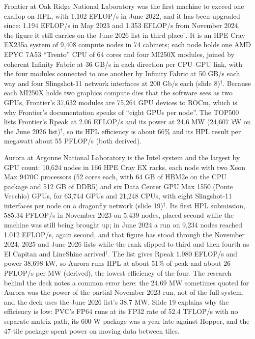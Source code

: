 \documentclass[11pt,letterpaper]{article}
\begin{document}
Frontier at Oak Ridge National Laboratory was the first machine to exceed one exaflop on HPL, with 1.102 EFLOP/s in June 2022, and it has been upgraded since: 1.194 EFLOP/s in May 2023 and 1.353 EFLOP/s from November 2024, the figure it still carries on the June 2026 list in third place$^\dagger$. It is an HPE Cray EX235a system of 9,408 compute nodes in 74 cabinets; each node holds one AMD EPYC 7A53 ``Trento'' CPU of 64 cores and four MI250X modules, joined by coherent Infinity Fabric at 36 GB/s in each direction per CPU--GPU link, with the four modules connected to one another by Infinity Fabric at 50 GB/s each way and four Slingshot-11 network interfaces at 200 Gb/s each (slide 8)$^\dagger$. Because each MI250X holds two graphics compute dies that the software sees as two GPUs, Frontier's 37,632 modules are 75,264 GPU devices to ROCm, which is why Frontier's documentation speaks of ``eight GPUs per node''. The TOP500 lists Frontier's Rpeak at 2.06 EFLOP/s and its power at 24.6 MW (24,607 kW on the June 2026 list)$^\dagger$, so its HPL efficiency is about 66\% and its HPL result per megawatt about 55 PFLOP/s (both derived).

Aurora at Argonne National Laboratory is the Intel system and the largest by GPU count: 10,624 nodes in 166 HPE Cray EX racks, each node with two Xeon Max 9470C processors (52 cores each, with 64 GB of HBM2e on the CPU package and 512 GB of DDR5) and six Data Center GPU Max 1550 (Ponte Vecchio) GPUs, for 63,744 GPUs and 21,248 CPUs, with eight Slingshot-11 interfaces per node on a dragonfly network (slide 19)$^\dagger$. Its first HPL submission, 585.34 PFLOP/s in November 2023 on 5,439 nodes, placed second while the machine was still being brought up; in June 2024 a run on 9,234 nodes reached 1.012 EFLOP/s, again second, and that figure has stood through the November 2024, 2025 and June 2026 lists while the rank slipped to third and then fourth as El Capitan and LineShine arrived$^\dagger$. The list gives Rpeak 1.980 EFLOP/s and power 38,698 kW, so Aurora runs HPL at about 51\% of peak and about 26 PFLOP/s per MW (derived), the lowest efficiency of the four. The research behind the deck notes a common error here: the 24.69 MW sometimes quoted for Aurora was the power of the partial November 2023 run, not of the full system, and the deck uses the June 2026 list's 38.7 MW. Slide 19 explains why the efficiency is low: PVC's FP64 runs at its FP32 rate of 52.4 TFLOP/s with no separate matrix path, its 600 W package was a year late against Hopper, and the 47-tile package spent power on moving data between tiles.
\end{document}
